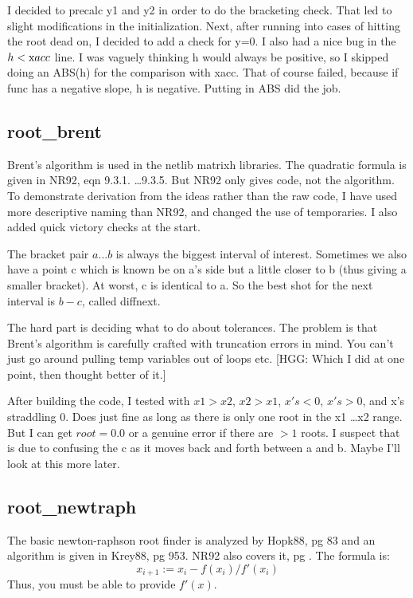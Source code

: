 I decided to precalc y1 and y2 in order to do the bracketing
check.  That led to slight modifications in the
initialization.  Next, after running into cases of hitting
the root dead on, I decided to add a check for y=0.  I also
had a nice bug in the $h < {\mbox xacc}$ line.  I was vaguely thinking h
would always be positive, so I skipped doing an ABS(h) for
the comparison with xacc.  That of course failed, because if
func has a negative slope, h is negative.  Putting in ABS
did the job.


\subsection*{root\_brent}
Brent's algorithm is used in the netlib matrixh libraries.
The quadratic formula is given in NR92, eqn 9.3.1. \dots 9.3.5.
But NR92 only gives code, not the algorithm.  To demonstrate
derivation from the ideas rather than the raw code, I have
used more descriptive naming than NR92, and changed the use
of temporaries.  I also added quick victory checks at the
start.

The bracket pair $a \dots b$ is always the biggest interval of
interest.  Sometimes we also have a point c which is known
be on a's side but a little closer to b (thus giving a
smaller bracket).  At worst, c is identical to a.  So the
best shot for the next interval is $b-c$, called diffnext.

The hard part is deciding what to do about tolerances.  The
problem is that Brent's algorithm is carefully crafted with
truncation errors in mind.  You can't just go around pulling
temp variables out of loops etc. [HGG: Which I did at one point,
then thought better of it.]

After building the code, I tested with $x1>x2$, $x2>x1$, $x's <0$,
$x's > 0$, and x's straddling 0.  Does just fine as long as
there is only one root in the x1 \dots x2 range.  But I can get
$root=0.0$ or a genuine error if there are $>1$ roots.  I
suspect that is due to confusing the c as it moves back and
forth between a and b.  Maybe I'll look at this more later.


\subsection*{root\_newtraph}
The basic newton-raphson root finder is analyzed by Hopk88,
pg 83 and an algorithm is given in Krey88, pg 953.  NR92
also covers it, pg .  The formula is:
\begin{equation}    
  x_{i+1}:=x_i-f(x_i)/f'(x_i)
\end{equation}
Thus, you must be able to provide $f'(x)$.

